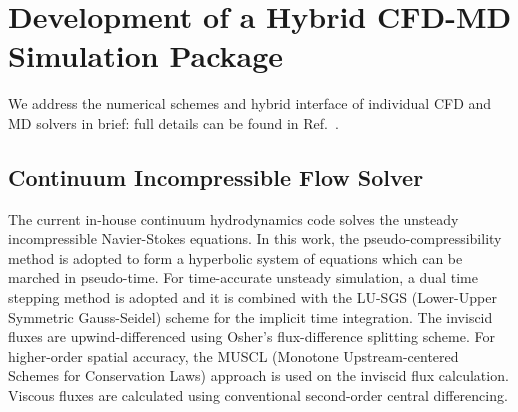 \documentclass[]{aiaa-tc}%
\begin{document}


\section{Development of a Hybrid CFD-MD Simulation Package}
\label{sec:numerics}

We address the numerical schemes and hybrid interface of individual CFD and MD
solvers in brief: full details can be found in Ref.~.

\subsection{Continuum Incompressible Flow Solver}
\label{sec:numerics_cfd}

The current in-house continuum hydrodynamics code solves the unsteady 
incompressible Navier-Stokes equations. In this work, the pseudo-compressibility 
method\cite{PseudoCompressibility} is adopted to form a hyperbolic system of 
equations which can be marched in pseudo-time.
For time-accurate unsteady simulation, a dual time stepping method is adopted 
and it is combined with the LU-SGS (Lower-Upper Symmetric Gauss-Seidel) scheme
\cite{LU-SGS} for the implicit time integration. The inviscid fluxes are 
upwind-differenced using Osher's flux-difference splitting scheme\cite{Osher}. 
For higher-order spatial accuracy, the MUSCL (Monotone Upstream-centered 
Schemes for Conservation Laws)\cite{MUSCL} approach is used on the inviscid 
flux calculation. Viscous fluxes are calculated using conventional 
second-order central differencing.




\end{document}

